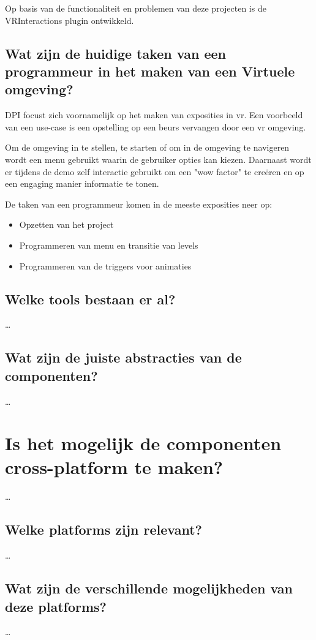Op basis van de functionaliteit en problemen van deze projecten is de VRInteractions plugin ontwikkeld.

\subsection{Wat zijn de huidige taken van een programmeur in het maken van een Virtuele omgeving?}
DPI focust zich voornamelijk op het maken van exposities in \gls{vr}. Een voorbeeld van een use-case is een opstelling op een beurs vervangen door een \gls{vr} omgeving.

Om de omgeving in te stellen, te starten of om in de omgeving te navigeren wordt een menu gebruikt waarin de gebruiker opties kan kiezen. Daarnaast wordt er tijdens de demo zelf interactie gebruikt om een "wow factor" te creëren en op een engaging manier informatie te tonen. 

De taken van een programmeur komen in de meeste exposities neer op:

\begin{itemize}
	\item Opzetten van het project
	\item Programmeren van menu en transitie van levels
	\item Programmeren van de triggers voor animaties 
\end{itemize}

\subsection{Welke tools bestaan er al?}
\dots
\subsection{Wat zijn de juiste abstracties van de componenten?}
\dots

\section{Is het mogelijk de componenten cross-platform te maken?}
\dots
\subsection{Welke platforms zijn relevant?}
\dots
\subsection{Wat zijn de verschillende mogelijkheden van deze platforms?}
\dots
